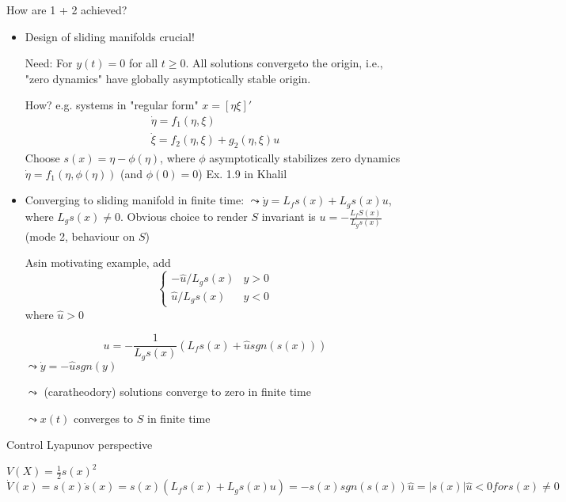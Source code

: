 
How are 1 + 2 achieved?
\begin{itemize}
\item Design of sliding manifolds crucial!

Need: For $y(t)=0$ for all $t \geq 0$. All solutions convergeto the origin, i.e., "zero dynamics" have globally asymptotically stable origin.

How? e.g. systems in "regular form"
$x = \left[ \eta \xi \right]'$ 
\begin{equation*}
\begin{array}{l}
     \dot{\eta} = f_1(\eta, \xi)\\
     \dot{\xi} = f_2(\eta, \xi) + g_2(\eta,\xi) u
\end{array}
\end{equation*}
Choose $s(x)=\eta - \phi(\eta)$, where $\phi$ asymptotically stabilizes zero dynamics $\dot{\eta} = f_1(\eta, \phi(\eta))$ (and $\phi(0) = 0$)
Ex. 1.9 in Khalil
\item Converging to sliding manifold in finite time:
$\leadsto \dot{y} = L_fs(x) + L_gs(x)u$, where $L_gs(x) \neq 0$. Obvious choice to render $S$ invariant is $u = - \frac{L_fS(x)}{L_gs(x)}$ (mode 2, behaviour on $S$)

Asin motivating example, add 
\begin{equation*}
\left \{ \begin{array}{ll}
     - \hat{u}/ L_gs(x) & y > 0 \\
     \hat{u} /L_gs(x) & y < 0
\end{array} \right.
\end{equation*}
where $\hat{u} > 0$

\begin{equation*}
 u = - \frac{1}{L_gs(x)}(L_fs(x) + \hat{u}sgn(s(x)))
\end{equation*}
$\leadsto \dot{y} = - \hat{u} sgn(y)$

$\leadsto $ (caratheodory) solutions converge to zero in finite time

$\leadsto x(t)$ converges to $S$ in finite time
\end{itemize}

Control Lyapunov perspective

$V(X) = \frac{1}{2}s(x)^2$
\begin{equation*}
\dot{V}(x) = s(x) \dot{s}(x) = s(x)(L_fs(x)+L_gs(x)u) = -s(x)sgn(s(x))\hat{u} = | s(x)|\hat{u} < 0 for s(x) \neq 0
\end{equation*}

